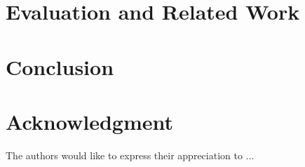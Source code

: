 \documentclass [a4paper,final,conference,10pt]{IDAACS}
\begin{document}


\section{Evaluation and Related Work}
\label{sec:eval}

\section{Conclusion}
\label{sec:concl}

\section*{Acknowledgment}
The authors would like to express their appreciation to ...
\enlargethispage{-7in}



\end{document}
